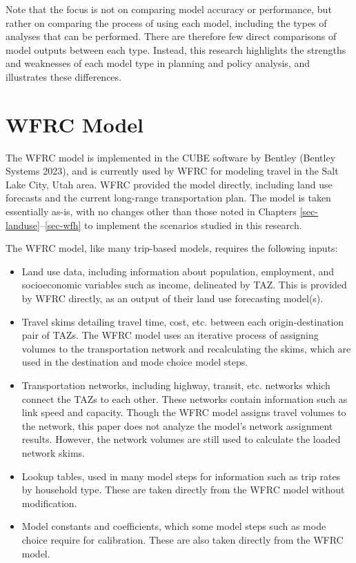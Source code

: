 \documentclass[fancy, oneside, mastersfancy, ms]{byuthesis}
\providecommand{\tightlist}{%
  \setlength{\itemsep}{0pt}\setlength{\parskip}{0pt}}\usepackage{longtable,booktabs,array}
\begin{document}
Note that the focus is not on comparing model accuracy or performance,
but rather on comparing the process of using each model, including the
types of analyses that can be performed. There are therefore few direct
comparisons of model outputs between each type. Instead, this research
highlights the strengths and weaknesses of each model type in planning
and policy analysis, and illustrates these differences.

\section{WFRC Model}\label{wfrc-model}

The WFRC model is implemented in the CUBE software by Bentley (Bentley
Systems 2023), and is currently used by WFRC for modeling travel in the
Salt Lake City, Utah area. WFRC provided the model directly, including
land use forecasts and the current long-range transportation plan. The
model is taken essentially as-is, with no changes other than those noted
in Chapters \ref{sec-landuse}--\ref{sec-wfh} to implement the scenarios
studied in this research.

The WFRC model, like many trip-based models, requires the following
inputs:

\begin{itemize}
\tightlist
\item
  Land use data, including information about population, employment, and
  socioeconomic variables such as income, delineated by TAZ. This is
  provided by WFRC directly, as an output of their land use forecasting
  model(s).
\item
  Travel skims detailing travel time, cost, etc. between each
  origin-destination pair of TAZs. The WFRC model uses an iterative
  process of assigning volumes to the transportation network and
  recalculating the skims, which are used in the destination and mode
  choice model steps.
\item
  Transportation networks, including highway, transit, etc. networks
  which connect the TAZs to each other. These networks contain
  information such as link speed and capacity. Though the WFRC model
  assigns travel volumes to the network, this paper does not analyze the
  model's network assignment results. However, the network volumes are
  still used to calculate the loaded network skims.
\item
  Lookup tables, used in many model steps for information such as trip
  rates by household type. These are taken directly from the WFRC model
  without modification.
\item
  Model constants and coefficients, which some model steps such as mode
  choice require for calibration. These are also taken directly from the
  WFRC model.
\end{itemize}
\end{document}

